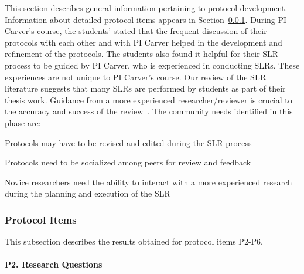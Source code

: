 This section describes general information pertaining to protocol development. Information about detailed protocol items appears in Section~\ref{sub:proto:items}. During PI Carver's course, the students' stated that the frequent discussion of their protocols with each other and with PI Carver helped in the development and refinement of the protocols. The students also found it helpful for their SLR process to be guided by PI Carver, who is experienced in conducting SLRs. These experiences are not unique to PI Carver's course. Our review of the SLR literature suggests that many SLRs are performed by students as part of their thesis work. Guidance from a more experienced researcher/reviewer is crucial to the accuracy and success of the review~\cite{EMendes_2005}. The community needs identified in this phase are:
\vspace*{-4pt}
\begin{itemize*}
\begin{bfseries}
\item Protocols may have to be revised and edited during the SLR process
\item Protocols need to be socialized among peers for review and feedback
\item Novice researchers need the ability to interact with a more experienced research during the planning and execution of the SLR
\end{bfseries}
\end{itemize*}
\vspace*{-4pt}

\subsubsection{Protocol Items}
\label{sub:proto:items}

This subsection describes the results obtained for protocol items P2-P6.

\paragraph{P2. Research Questions}

